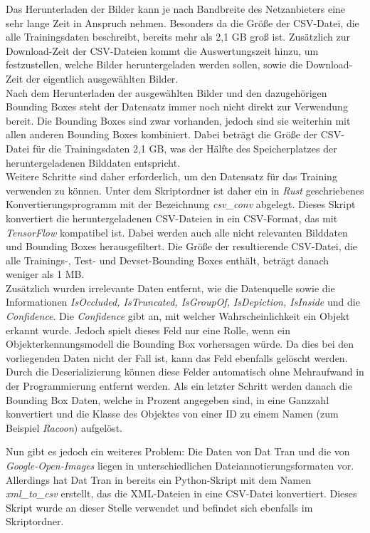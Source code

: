 Das Herunterladen der Bilder kann je nach Bandbreite des Netzanbieters eine sehr lange Zeit in Anspruch nehmen. Besonders da die Größe der CSV-Datei, die alle Trainingsdaten beschreibt, bereits mehr als 2,1 GB groß ist. Zusätzlich zur Download-Zeit der CSV-Dateien kommt die Auswertungszeit hinzu, um festzustellen, welche Bilder heruntergeladen werden sollen, sowie die Download-Zeit der eigentlich ausgewählten Bilder.
\\
Nach dem Herunterladen der ausgewählten Bilder und den dazugehörigen Bounding Boxes steht der Datensatz immer noch nicht direkt zur Verwendung bereit. Die Bounding Boxes sind zwar vorhanden, jedoch sind sie weiterhin mit allen anderen Bounding Boxes kombiniert. Dabei beträgt die Größe der CSV-Datei für die Trainingsdaten 2,1 GB, was der Hälfte des Speicherplatzes der heruntergeladenen Bilddaten entspricht.
\\
Weitere Schritte sind daher erforderlich, um den Datensatz für das Training verwenden zu können. Unter dem Skriptordner ist daher ein in \textit{Rust} geschriebenes Konvertierungsprogramm mit der Bezeichnung \textit{csv\_conv} abgelegt. Dieses Skript konvertiert die heruntergeladenen CSV-Dateien in ein CSV-Format, das mit \textit{TensorFlow} kompatibel ist. Dabei werden auch alle nicht relevanten Bilddaten und Bounding Boxes herausgefiltert. Die Größe der resultierende CSV-Datei, die alle Trainings-, Test- und Devset-Bounding Boxes enthält, beträgt danach weniger als 1 MB.\\
Zusätzlich wurden irrelevante Daten entfernt, wie die Datenquelle sowie die Informationen \textit{IsOccluded, IsTruncated, IsGroupOf, IsDepiction, IsInside} und die \textit{Confidence}. Die \textit{Confidence} gibt an, mit welcher Wahrscheinlichkeit ein Objekt erkannt wurde. Jedoch spielt dieses Feld nur eine Rolle, wenn ein Objekterkennungsmodell die Bounding Box vorhersagen würde. Da dies bei den vorliegenden Daten nicht der Fall ist, kann das Feld ebenfalls gelöscht werden.
\\
Durch die Deserializierung können diese Felder automatisch ohne Mehraufwand in der Programmierung entfernt werden.
Als ein letzter Schritt werden danach die Bounding Box Daten, welche in Prozent angegeben sind, in eine Ganzzahl konvertiert und die Klasse des Objektes von einer ID zu einem Namen (zum Beispiel \textit{Racoon}) aufgelöst.

Nun gibt es jedoch ein weiteres Problem: Die Daten von Dat Tran und die von \textit{Google-Open-Images} liegen in unterschiedlichen Dateiannotierungsformaten vor. Allerdings hat Dat Tran in \cite{wasch_detect} bereits ein Python-Skript mit dem Namen \textit{xml\_to\_csv} erstellt, das die XML-Dateien in eine CSV-Datei konvertiert. Dieses Skript wurde an dieser Stelle verwendet und befindet sich ebenfalls im Skriptordner.

